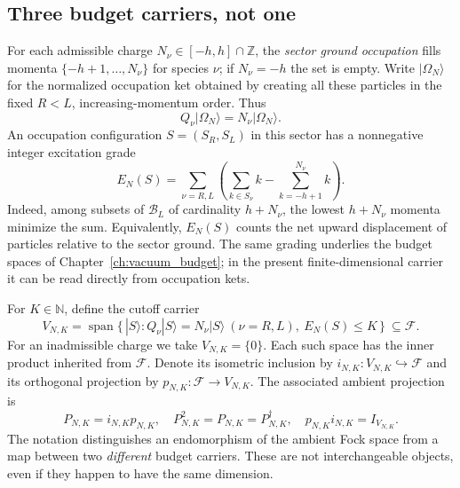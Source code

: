 \subsection{Three budget carriers, not one}
\label{subsec:ch20-budget}

For each admissible charge \(N_\nu\in[-h,h]\cap\mathbb Z\), the
\emph{sector ground occupation} fills momenta
\(\{-h+1,\ldots,N_\nu\}\) for species \(\nu\); if
\(N_\nu=-h\) the set is empty.  Write \(|\Omega_N\rangle\) for the
normalized occupation ket obtained by creating all these particles in
the fixed \(R<L\), increasing-momentum order.  Thus
\begin{equation}
  Q_\nu|\Omega_N\rangle=N_\nu|\Omega_N\rangle.
 \label{eq:ch20-ground-charge}
\end{equation}
An occupation configuration \(S=(S_R,S_L)\) in this sector has a
nonnegative integer excitation grade
\begin{equation}
 E_N(S)=\sum_{\nu=R,L}\left(
      \sum_{k\in S_\nu}k
      -\sum_{k=-h+1}^{N_\nu}k\right).
 \label{eq:ch20-excitation}
\end{equation}
Indeed, among subsets of \(\mathcal B_L\) of cardinality \(h+N_\nu\),
the lowest \(h+N_\nu\) momenta minimize the sum.  Equivalently,
\(E_N(S)\) counts the net upward displacement of particles relative to
the sector ground.  The same grading underlies the budget spaces of
Chapter~\ref{ch:vacuum_budget}; in the present finite-dimensional carrier
it can be read directly from occupation kets.

For \(K\in\mathbb N\), define the cutoff carrier
\begin{equation}
 V_{N,K}=\operatorname{span}\{\,|S\rangle:
       Q_\nu|S\rangle=N_\nu|S\rangle\ (\nu=R,L),
       \ E_N(S)\leq K\,\}\ \subseteq\mathcal F.
 \label{eq:ch20-budget-carrier}
\end{equation}
For an inadmissible charge we take \(V_{N,K}=\{0\}\).  Each such space
has the inner product inherited from \(\mathcal F\).  Denote its
isometric inclusion by \(i_{N,K}:V_{N,K}\hookrightarrow\mathcal F\)
and its orthogonal projection by
\(p_{N,K}:\mathcal F\to V_{N,K}\).  The associated ambient
projection is
\begin{equation}
 P_{N,K}=i_{N,K}p_{N,K},\quad
 P_{N,K}^{2}=P_{N,K}=P_{N,K}^{\dagger},\quad
 p_{N,K}i_{N,K}=I_{V_{N,K}}.
 \label{eq:ch20-typed-projections}
\end{equation}
The notation distinguishes an endomorphism of the ambient Fock space
from a map between two \emph{different} budget carriers.  These are not
interchangeable objects, even if they happen to have the same dimension.

